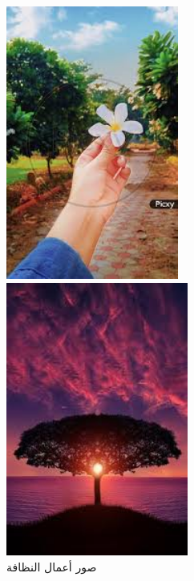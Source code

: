 \documentclass{article}
\begin{document}
\begin{figure}[H]
    \begin{minipage}{0.45\textwidth}
        \centering
        \includegraphics[height=9cm,width=\textwidth]{cleaning/3.jpg}
    \end{minipage}
    \hfill
    \begin{minipage}{0.45\textwidth}
        \centering
        \includegraphics[height=9cm,width=\textwidth]{cleaning/4.jpg}
    \end{minipage}
        \caption{صور أعمال النظافة}
\end{figure}
\end{document}
